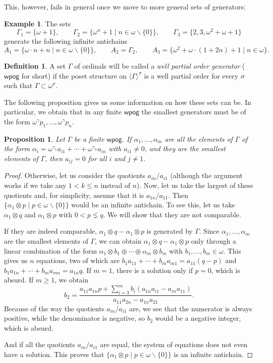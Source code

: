 \documentclass[reqno]{amsart}
\newtheorem{proposition}[theorem]{Proposition}
\theoremstyle{definition}
\theoremstyle{definition}
\newtheorem{definition}[theorem]{Definition}
\newtheorem{example}[theorem]{Example}
\theoremstyle{plain} %
\begin{document}
This, however, fails in general once we move to more general sets of generators:
\begin{example}
    The sets $$\Gamma_1=\{\omega+1\},\qquad \Gamma_2=\{\omega^n+1 \mid n\in\omega\backslash\{0\} \},\qquad \Gamma_3=\{2,3, \omega^2+\omega+1 \} $$generate the following infinite antichains $$A_1=\{\omega\cdot n+n \mid n\in\omega\backslash\{0\} \},\qquad A_2=\Gamma_2,\qquad A_3=\{\omega^2+\omega\cdot(1+2n)+1 \mid n\in\omega\}. $$
\end{example}
\begin{definition}\label{defwellor}
    A set $\Gamma$ of ordinals will be called a \textit{well partial order generator} ($\mathsf{wpog}$ for short) if the poset structure on $\langle \Gamma\rangle^\sigma$ is a well partial order for every $\sigma$ such that $\Gamma\subset\omega^\sigma$.
\end{definition}
The following proposition gives us some information on how these sets can be. In particular, we obtain that in any finite $\mathsf{wpog}$ the smallest generators must be of the form $\omega^\gamma p_1,\dots,\omega^{\gamma}p_n$.
\begin{proposition}
Let $\Gamma$ be a finite $\mathsf{wpog}$. If $\alpha_1, \dots, \alpha_m$ are all the elements of $\Gamma$ of the form
\(
\alpha_i = \omega^{\gamma_1} a_{i1} + \cdots + \omega^{\gamma_n} a_{in}
\)
with $a_{i1} \neq 0$, and they are the smallest elements of $\Gamma$, then $a_{ij} = 0$ for all $i$ and $j \neq 1$.
\end{proposition}
\begin{proof}
    Otherwise, let us consider the quotients $a_{in} / a_{i1}$ (although the argument works if we take any $1<k \leq n$ instead of $n$). Now, let us take the largest of these quotients and, for simplicity, assume that it is $a_{1n} / a_{11}$. Then $\{\alpha_1\otimes p \mid p\in\omega\backslash\{0\}\} $ would be an infinite antichain. To see this, let us take $\alpha_1 \otimes q$ and $\alpha_1 \otimes p$ with $0 < p \lneq q$. We will show that they are not comparable.
    
    If they are indeed comparable, $\alpha_1 \otimes q-\alpha_1 \otimes p$ is generated by $\Gamma$. Since $\alpha_1, \dots, \alpha_m$ are the smallest elements of $\Gamma$, we can obtain $\alpha_1 \otimes q-\alpha_1 \otimes p$ only through a linear combination of the form $\alpha_1\otimes b_1\oplus\cdots\oplus\alpha_m\otimes b_m$ with $b_1,\dots,b_m\in\omega$. This gives us $n$ equations, two of which are $b_1 a_{11}+\cdots+b_m a_{m1}=a_{11}(q-p)$ and $b_1 a_{1n}+\cdots+b_m a_{mn}=a_{1n} q$. If $m = 1$, there is a solution only if $p = 0$, which is absurd. If $m\geq1$, we obtain $$b_2=\frac{a_{11}a_{1n}p+\sum_{i=3}^mb_i(a_{1n}a_{i1}-a_{in}a_{11})}{a_{11}a_{2n}-a_{1n}a_{21}}. $$ Because of the way the quotients $a_{in} / a_{i1}$ are, we see that the numerator is always positive, while the denominator is negative, so $b_2$ would be a negative integer, which is absurd.

    And if all the quotients $a_{in} / a_{i1}$ are equal, the system of equations does not even have a solution. This proves that $\{\alpha_1\otimes p \mid p\in\omega\backslash\{0\}\} $ is an infinite antichain.
\end{proof}
\end{document}
